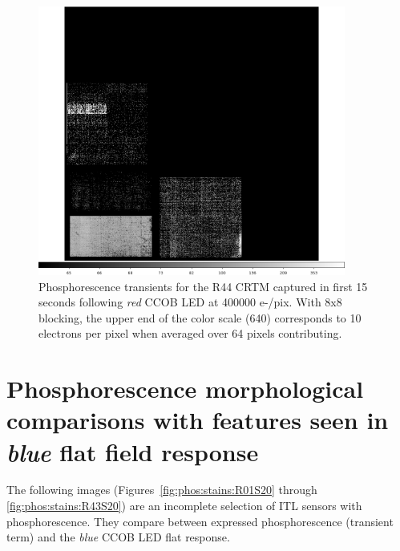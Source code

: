 \begin{figure}[!htbp]
\centering
\includegraphics[width=0.9\textwidth]{sections/figures/phosphorescence-survey/itl_fluor_R44_0-19_rb1_log.png}
\caption{Phosphorescence transients for the R44 CRTM captured in first 15 seconds following {\it red} CCOB LED at 400000 e-/pix. With 8x8 blocking, the upper end of the color scale (640) corresponds to 10 electrons per pixel when averaged over 64 pixels contributing.}
\label{fig:phos:R44}
\end{figure}

\section{Phosphorescence morphological comparisons with features seen in {\it blue} flat field response}

The following images (Figures~\ref{fig:phos:stains:R01S20} through \ref{fig:phos:stains:R43S20}) are an incomplete selection of ITL sensors with phosphorescence. They compare between expressed phosphorescence (transient term) and the {\it blue} CCOB LED flat response.

